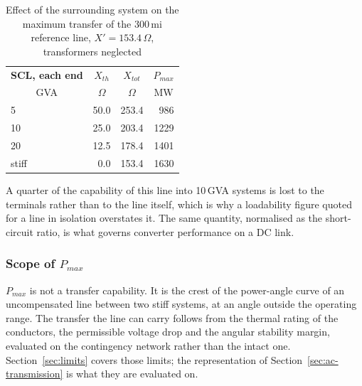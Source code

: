 \begin{table}[!ht]
  \centering
  \begin{tabular}{@{}l r r r@{}}
    \toprule
    \textbf{SCL, each end} & \multicolumn{1}{c}{\textbf{$X_{th}$}}
      & \multicolumn{1}{c}{\textbf{$X_{tot}$}}
      & \multicolumn{1}{c}{\textbf{$P_{max}$}} \\
    \multicolumn{1}{c}{GVA} & \multicolumn{1}{c}{$\Omega$}
      & \multicolumn{1}{c}{$\Omega$} & \multicolumn{1}{c}{MW} \\
    \midrule
    5      & 50.0 & 253.4 &  986 \\
    10     & 25.0 & 203.4 & 1229 \\
    20     & 12.5 & 178.4 & 1401 \\
    stiff  &  0.0 & 153.4 & 1630 \\
    \bottomrule
  \end{tabular}
  \caption{Effect of the surrounding system on the maximum transfer of the
           300\,mi reference line, $X' = 153.4\,\Omega$, transformers
           neglected}
  \label{tab:ref-scr}
\end{table}

A quarter of the capability of this line into 10\,GVA systems is lost to the
terminals rather than to the line itself, which is why a loadability figure
quoted for a line in isolation overstates it. The same quantity, normalised
as the short-circuit ratio, is what governs converter performance on a DC
link.

\subsubsection{Scope of $P_{max}$}
\label{sec:ref-caveat}

$P_{max}$ is not a transfer capability. It is the crest of the power-angle
curve of an uncompensated line between two stiff systems, at an angle
outside the operating range. The transfer the line can carry follows from
the thermal rating of the conductors, the permissible voltage drop and the
angular stability margin, evaluated on the contingency network rather than
the intact one. Section~\ref{sec:limits} covers those limits; the
representation of Section~\ref{sec:ac-transmission} is what they are
evaluated on.

\FloatBarrier
